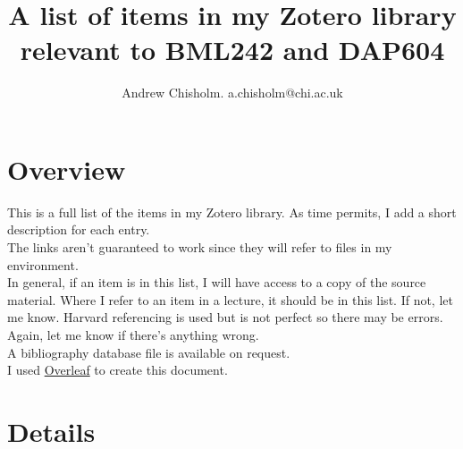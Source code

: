\documentclass[a4paper]{article}
\title{A list of items in my Zotero library relevant to BML242 and DAP604}
\author{Andrew Chisholm. a.chisholm@chi.ac.uk}
\date{}
\begin{document}
\maketitle

\section*{Overview}

This is a full list of the items in my Zotero library. As time permits, I add a short description for each entry.
\\

The links aren't guaranteed to work since they will refer to files in my environment.
\\

In general, if an item is in this list, I will have access to a copy of the source material. Where I refer to an item in a lecture, it should be in this list. If not, let me know. Harvard referencing is used but is not perfect so there may be errors. Again, let me know if there's anything wrong.
\\

A bibliography database file is available on request.
\\

I used \href{http://www.overleaf.com}{Overleaf} to create this document.

\section*{Details}
\end{document}
